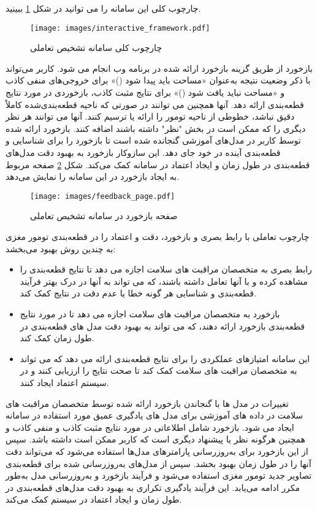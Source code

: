 چارچوب کلی این سامانه را می توانید در شکل \ref{fig:interactive_framework} ببینید.
\begin{figure}[ht]
\centerline{\texttt{[image: images/interactive\_framework.pdf]}}
\caption[\hspace{0.5em}چارچوب کلی سامانه تشخیص تعاملی]{چارچوب کلی سامانه تشخیص تعاملی\cite{sailunaz2023brain}}
\label{fig:interactive_framework}
\end{figure}
بازخورد از طریق گزینه بازخورد ارائه شده در برنامه وب انجام می شود. کاربر می‌تواند با ذکر وضعیت نتیجه به‌عنوان «مساحت باید پیدا شود ()» برای خروجی‌های منفی کاذب و «مساحت نباید یافت شود ()» برای نتایج مثبت کاذب، بازخوردی در مورد نتایج قطعه‌بندی ارائه دهد. آنها همچنین می توانند در صورتی که ناحیه قطعه‌‌بندی‌شده کاملاً دقیق نباشد، خطوطی از ناحیه تومور را ارائه یا ترسیم کنند. آنها می توانند هر نظر دیگری را که ممکن است در بخش "نظر" داشته باشند اضافه کنند. بازخورد ارائه شده توسط کاربر در مدل‌های آموزشی گنجانده شده است تا بازخورد را برای شناسایی و قطعه‌بندی آینده در خود جای دهد. این سازوکار بازخورد به بهبود دقت مدل‌های قطعه‌بندی در طول زمان و ایجاد اعتماد در سامانه کمک می‌کند. شکل \ref{fig:feedback_page} صفحه مربوط به ایجاد بازخورد در این سامانه را نمایش می‌دهد.
\begin{figure}[ht]
\centerline{\texttt{[image: images/feedback\_page.pdf]}}
\caption[\hspace{0.5em}صفحه بازخورد در سامانه تشخیص تعاملی]{صفحه بازخورد در سامانه تشخیص تعاملی\cite{sailunaz2023brain}}
\label{fig:feedback_page}
\end{figure}
چارچوب تعاملی با رابط بصری و بازخورد، دقت و اعتماد را در ‌قطعه‌بندی تومور مغزی به چندین روش بهبود می‌بخشد:
\begin{itemize}
    \item رابط بصری به متخصصان مراقبت های سلامت اجازه می دهد تا نتایج قطعه‌بندی را مشاهده کرده و با آنها تعامل داشته باشند، که می تواند به آنها در درک بهتر فرآیند قطعه‌بندی و شناسایی هر گونه خطا یا عدم دقت در نتایج کمک کند.
    \item بازخورد به متخصصان مراقبت های سلامت اجازه می دهد تا در مورد نتایج قطعه‌بندی بازخورد ارائه دهند، که می تواند به بهبود دقت مدل های قطعه‌بندی در طول زمان کمک کند.
    \item این سامانه امتیازهای عملکردی را برای نتایج قطعه‌بندی ارائه می دهد که می تواند به متخصصان مراقبت های سلامت کمک کند تا صحت نتایج را ارزیابی کنند و در سیستم اعتماد ایجاد کنند.
\end{itemize}
تغییرات در مدل ها با گنجاندن بازخورد ارائه شده توسط متخصصان مراقبت های سلامت در داده های آموزشی برای مدل های یادگیری عمیق مورد استفاده در سامانه ایجاد می شود. بازخورد شامل اطلاعاتی در مورد نتایج مثبت کاذب و منفی کاذب و همچنین هرگونه نظر یا پیشنهاد دیگری است که کاربر ممکن است داشته باشد. سپس از این بازخورد برای به‌روزرسانی پارامترهای مدل‌ها استفاده می‌شود که می‌تواند دقت آنها را در طول زمان بهبود بخشد. سپس از مدل‌های به‌روزرسانی شده برای ‌قطعه‌بندی تصاویر جدید تومور مغزی استفاده می‌شود و فرآیند بازخورد و به‌روزرسانی مدل به‌طور مکرر ادامه می‌یابد. این فرآیند یادگیری تکراری به بهبود دقت مدل‌های قطعه‌بندی در طول زمان و ایجاد اعتماد در سیستم کمک می‌کند.\\
